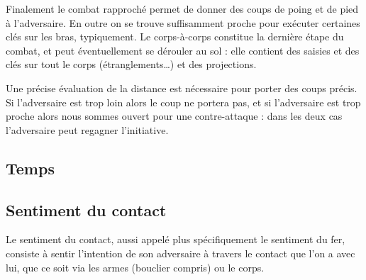 Finalement le combat rapproché permet de donner des coups de poing et de pied à l'adversaire.
En outre on se trouve suffisamment proche pour exécuter certaines clés sur les bras, typiquement.
Le corps-à-corps constitue la dernière étape du combat, et peut éventuellement se dérouler au sol : elle contient des saisies et des clés sur tout le corps (étranglements…) et des projections.

Une précise évaluation de la distance est nécessaire pour porter des coups précis.
Si l'adversaire est trop loin alors le coup ne portera pas, et si l'adversaire est trop proche alors nous sommes ouvert pour une contre-attaque : dans les deux cas l'adversaire peut regagner l'initiative.


\subsection{Temps}


\subsection{Sentiment du contact}


\begin{definition}

Le sentiment du contact, aussi appelé plus spécifiquement le sentiment du fer, consiste à sentir l'intention de son adversaire à travers le contact que l'on a avec lui, que ce soit via les armes (bouclier compris) ou le corps.
\end{definition}


